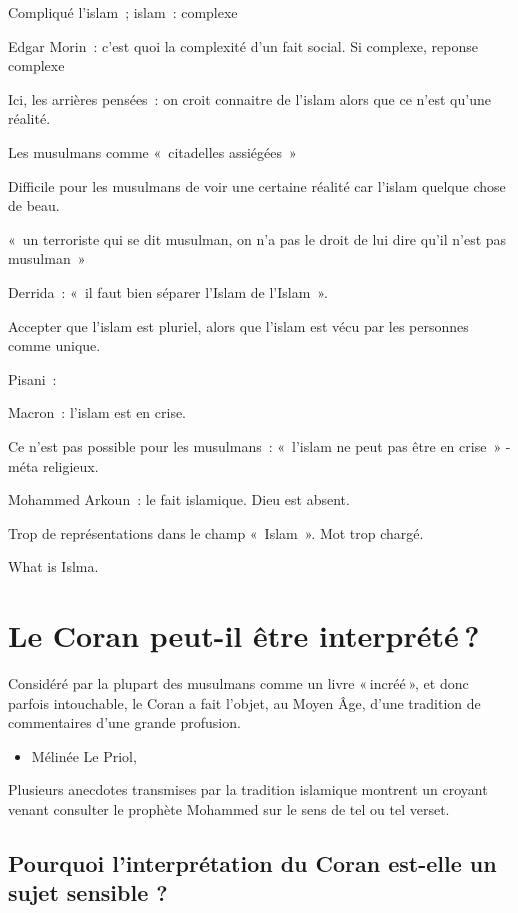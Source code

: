 Compliqué l'islam~; islam~: complexe

Edgar Morin~: c'est quoi la complexité d'un fait social. Si complexe,
reponse complexe

Ici, les arrières pensées~: on croit connaitre de l'islam alors que ce
n'est qu'une réalité.

Les musulmans comme «~citadelles assiégées~»

Difficile pour les musulmans de voir une certaine réalité car l'islam
quelque chose de beau.

«~un terroriste qui se dit musulman, on n'a pas le droit de lui dire
qu'il n'est pas musulman~»

Derrida~: «~il faut bien séparer l'Islam de l'Islam~».

Accepter que l'islam est pluriel, alors que l'islam est vécu par les
personnes comme unique.

Pisani~:

Macron~: l'islam est en crise.

Ce n'est pas possible pour les musulmans~: «~l'islam ne peut pas être en
crise~» - méta religieux.

Mohammed Arkoun~: le fait islamique. Dieu est absent.

Trop de représentations dans le champ «~Islam~». Mot trop chargé.

What is Islma.

\section{Le Coran peut-il être interprété ?}

 

Considéré par la plupart des musulmans comme un livre « incréé », et
donc parfois intouchable, le Coran a fait l'objet, au Moyen Âge, d'une
tradition de commentaires d'une grande profusion. 

\begin{itemize}
\item
  Mélinée Le Priol,~
\end{itemize}


Plusieurs anecdotes transmises par la tradition islamique montrent un
croyant venant consulter le prophète Mohammed sur le sens de tel ou tel
verset.

\subsection{Pourquoi l'interprétation du Coran est-elle un sujet sensible
?}

